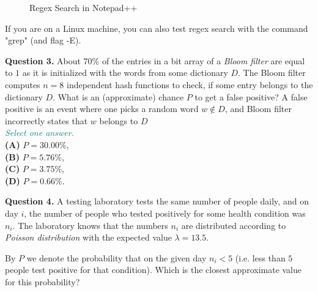 \documentclass[jou]{apa6}
\begin{document}
\begin{figure}[!htb]
\caption{\label{fig:regex-search} Regex Search in Notepad++}
\end{figure}

If you are on a Linux machine, you can also 
test regex search with the command "grep" (and flag -E). 


\vspace{10pt}
{\bf Question 3.} About 70\% of the entries in a bit array of a {\em Bloom filter} are 
equal to $1$ as it is initialized with the words 
from some dictionary $D$. 
The Bloom filter computes $n=8$ independent hash functions to check, 
if some entry belongs to the dictionary $D$. 
What is an (approximate) chance $P$ to get a false positive?
A false positive is an event where one picks 
a random word $w \not\in D$,
and Bloom filter incorrectly states that $w$ belongs to $D$\\

\vspace{4pt}
\textcolor{teal}{\em Select one answer.}\\
{\bf (A)} $P = 30.00\%$,\\
{\bf (B)} $P = 5.76\%$,\\
{\bf (C)} $P = 3.75\%$,\\
{\bf (D)} $P = 0.66\%$.



\vspace{10pt}
{\bf Question 4.} 
A testing laboratory tests the same number of people daily, and on day $i$, the number
of people who tested positively for some health condition was $n_i$. The laboratory knows that 
the numbers $n_i$ are distributed according to {\em Poisson distribution} with the 
expected value $\lambda = 13.5$. 

By $P$ we denote the probability that on the given day 
$n_i < 5$ (i.e. less than $5$ people test 
positive for that condition). Which is the closest approximate value for this probability? 
\end{document}
